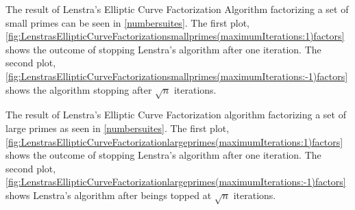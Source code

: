 The result of Lenstra's Elliptic Curve Factorization Algorithm factorizing a set of small primes can be seen in \ref{numbersuites}. The first plot, \ref{fig:LenstrasEllipticCurveFactorizationsmallprimes(maximumIterations:1)factors} shows the outcome of stopping Lenstra's algorithm after one iteration. The second plot, \ref{fig:LenstrasEllipticCurveFactorizationsmallprimes(maximumIterations:-1)factors} shows the algorithm stopping after $\sqrt{n}$ iterations.




The result of Lenstra's Elliptic Curve Factorization algorithm factorizing a set of large primes as seen in \ref{numbersuites}. The first plot, \ref{fig:LenstrasEllipticCurveFactorizationlargeprimes(maximumIterations:1)factors} shows the outcome of stopping Lenstra's algorithm after one iteration. The second plot, \ref{fig:LenstrasEllipticCurveFactorizationlargeprimes(maximumIterations:-1)factors} shows Lenstra's algorithm after beings topped at $\sqrt{n}$ iterations.


